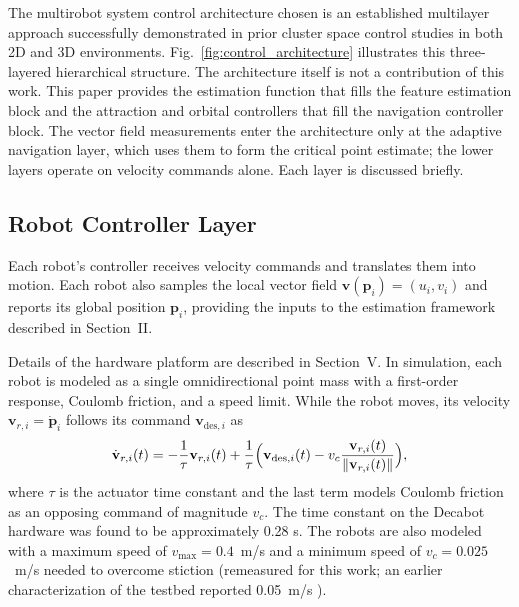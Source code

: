 \documentclass[lettersize,journal]{IEEEtran}
\begin{document}
The multirobot system control architecture chosen is an established multilayer approach successfully demonstrated in prior cluster space control studies in both 2D \cite{5,8,10} and 3D \cite{7,9} environments. Fig.~\ref{fig:control_architecture} illustrates this three-layered hierarchical structure. The architecture itself is not a contribution of this work. This paper provides the estimation function that fills the feature estimation block and the attraction and orbital controllers that fill the navigation controller block. The vector field measurements enter the architecture only at the adaptive navigation layer, which uses them to form the critical point estimate; the lower layers operate on velocity commands alone. Each layer is discussed briefly.



\subsection{Robot Controller Layer}
\noindent 

Each robot's controller receives velocity commands and translates them into motion. Each robot also samples the local vector field $\mathbf{v}(\mathbf{p}_i) = (u_i, v_i)$ and reports its global position $\mathbf{p}_i$, providing the inputs to the estimation framework described in Section~II.

Details of the hardware platform are described in Section~V. In simulation, each robot is modeled as a single omnidirectional point mass with a first-order response, Coulomb friction, and a speed limit. While the robot moves, its velocity $\mathbf{v}_{r,i} = \dot{\mathbf{p}}_i$ follows its command $\mathbf{v}_{\text{des},i}$ as
\begin{equation}
    \dot{\mathbf{v}}_{r,i}(t) = -\frac{1}{\tau}\mathbf{v}_{r,i}(t) + \frac{1}{\tau}\Bigl(\mathbf{v}_{\text{des},i}(t) - v_c\frac{\mathbf{v}_{r,i}(t)}{\|\mathbf{v}_{r,i}(t)\|}\Bigr),
    \label{eq:continuous}
\end{equation}
where $\tau$ is the actuator time constant \cite{4,7} and the last term models Coulomb friction as an opposing command of magnitude $v_c$. The time constant on the Decabot hardware was found to be approximately 0.28 s.  The robots are also modeled with a maximum speed of $v_{\max} = 0.4$~m/s and a minimum speed of $v_c = 0.025$~m/s needed to overcome stiction (remeasured for this work; an earlier characterization of the testbed reported 0.05~m/s \cite{22}).
\end{document}
